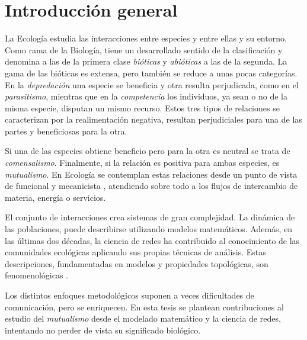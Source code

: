 
\chapter{Introducción general} %

\label{INTROGEN} %


La Ecología estudia las interacciones entre especies y entre ellas  y su entorno. Como rama de la Biología, tiene un desarrollado sentido de la clasificación y denomina a las de la primera clase \textit{bióticas} y \textit{abióticas} a las de la segunda. La gama de las bióticas es extensa, pero también se reduce a unas pocas categorías. En la \textit{depredación} una especie se beneficia y otra resulta perjudicada, como en el \textit{parasitismo}, mientras que en la \textit{competencia} los individuos, ya sean o no de la misma especie, disputan un mismo recurso. Estos tres tipos de relaciones se caracterizan por la realimentación negativa, resultan perjudiciales para una de las partes y beneficiosas para la otra. 

Si una de las especies obtiene beneficio pero para la otra es neutral se trata de \textit{comensalismo}. Finalmente, si la relación es positiva para ambas especies, es \textit{mutualismo}. En Ecología se contemplan estas relaciones desde un punto de vista de funcional y mecanicista \cite{rockwood2006introduction}, atendiendo sobre todo a los flujos de intercambio de materia, energía o servicios.

El conjunto de interacciones crea sistemas de gran complejidad. La dinámica de las poblaciones, puede describirse utilizando modelos matemáticos. Además, en las últimas dos décadas, la ciencia de redes ha contribuido al conocimiento de las comunidades ecológicas aplicando sus propias técnicas de análisis. Estas descripciones, fundamentadas en modelos y propiedades topológicas, son fenomenológicas \cite{van2010ethical}.

Los distintos enfoques metodológicos suponen a veces dificultades de comunicación, pero se enriquecen. En esta tesis se plantean contribuciones al estudio del \textit{mutualismo} desde el modelado matemático y la ciencia de redes, intentando no perder de vista su significado biológico.

